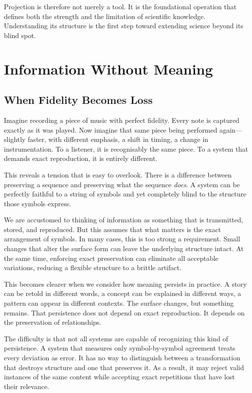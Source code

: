 \documentclass[11pt,openany]{book}
\begin{document}
Projection is therefore not merely a tool. It is the foundational operation that defines both the strength and the limitation of scientific knowledge. Understanding its structure is the first step toward extending science beyond its blind spot.

\chapter{Information Without Meaning}
\label{ch:information}

\section*{ When Fidelity Becomes Loss}

Imagine recording a piece of music with perfect fidelity. Every note is captured exactly as it was played. Now imagine that same piece being performed again—slightly faster, with different emphasis, a shift in timing, a change in instrumentation. To a listener, it is recognisably the same piece. To a system that demands exact reproduction, it is entirely different.

This reveals a tension that is easy to overlook. There is a difference between preserving a sequence and preserving what the sequence \emph{does}. A system can be perfectly faithful to a string of symbols and yet completely blind to the structure those symbols express.

We are accustomed to thinking of information as something that is transmitted, stored, and reproduced. But this assumes that what matters is the exact arrangement of symbols. In many cases, this is too strong a requirement. Small changes that alter the surface form can leave the underlying structure intact. At the same time, enforcing exact preservation can eliminate all acceptable variations, reducing a flexible structure to a brittle artifact.

This becomes clearer when we consider how meaning persists in practice. A story can be retold in different words, a concept can be explained in different ways, a pattern can appear in different contexts. The surface changes, but something remains. That persistence does not depend on exact reproduction. It depends on the preservation of relationships.

The difficulty is that not all systems are capable of recognizing this kind of persistence. A system that measures only symbol-by-symbol agreement treats every deviation as error. It has no way to distinguish between a transformation that destroys structure and one that preserves it. As a result, it may reject valid instances of the same content while accepting exact repetitions that have lost their relevance.
\end{document}
